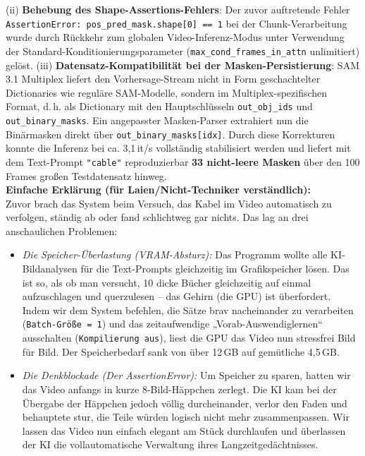 \documentclass[12pt,a4paper]{article}
\begin{document}
\begin{enumerate}
            (ii) \textbf{Behebung des Shape-Assertions-Fehlers}: Der zuvor auftretende Fehler \texttt{AssertionError: pos\_pred\_mask.shape[0] == 1} bei der Chunk-Verarbeitung wurde durch Rückkehr zum globalen Video-Inferenz-Modus unter Verwendung der Standard-Konditionierungsparameter (\texttt{max\_cond\_frames\_in\_attn} unlimitiert) gelöst.
            (iii) \textbf{Datensatz-Kompatibilität bei der Masken-Persistierung}: SAM 3.1 Multiplex liefert den Vorhersage-Stream nicht in Form geschachtelter Dictionaries wie reguläre SAM-Modelle, sondern im Multiplex-spezifischen Format, d.\,h. als Dictionary mit den Hauptschlüsseln \texttt{out\_obj\_ids} und \texttt{out\_binary\_masks}. Ein angepasster Masken-Parser extrahiert nun die Binärmasken direkt über \texttt{out\_binary\_masks[idx]}.
            Durch diese Korrekturen konnte die Inferenz bei ca. 3,1\,it/s vollständig stabilisiert werden und liefert mit dem Text-Prompt \texttt{"cable"} reproduzierbar \textbf{33 nicht-leere Masken} über den 100 Frames großen Testdatensatz hinweg. \\
            \textbf{Einfache Erklärung (für Laien/Nicht-Techniker verständlich):} \\
            Zuvor brach das System beim Versuch, das Kabel im Video automatisch zu verfolgen, ständig ab oder fand schlichtweg gar nichts. Das lag an drei anschaulichen Problemen:
            \begin{itemize}
                \item \textit{Die Speicher-Überlastung (VRAM-Absturz):} Das Programm wollte alle KI-Bildanalysen für die Text-Prompts gleichzeitig im Grafikspeicher lösen. Das ist so, als ob man versucht, 10 dicke Bücher gleichzeitig auf einmal aufzuschlagen und querzulesen -- das Gehirn (die GPU) ist überfordert. Indem wir dem System befehlen, die Sätze brav nacheinander zu verarbeiten (\texttt{Batch-Größe = 1}) und das zeitaufwendige „Vorab-Auswendiglernen“ ausschalten (\texttt{Kompilierung aus}), liest die GPU das Video nun stressfrei Bild für Bild. Der Speicherbedarf sank von über 12\,GB auf gemütliche 4,5\,GB.
                \item \textit{Die Denkblockade (Der AssertionError):} Um Speicher zu sparen, hatten wir das Video anfangs in kurze 8-Bild-Häppchen zerlegt. Die KI kam bei der Übergabe der Häppchen jedoch völlig durcheinander, verlor den Faden und behauptete stur, die Teile würden logisch nicht mehr zusammenpassen. Wir lassen das Video nun einfach elegant am Stück durchlaufen und überlassen der KI die vollautomatische Verwaltung ihres Langzeitgedächtnisses.

\end{itemize}
\end{enumerate}
\end{document}
